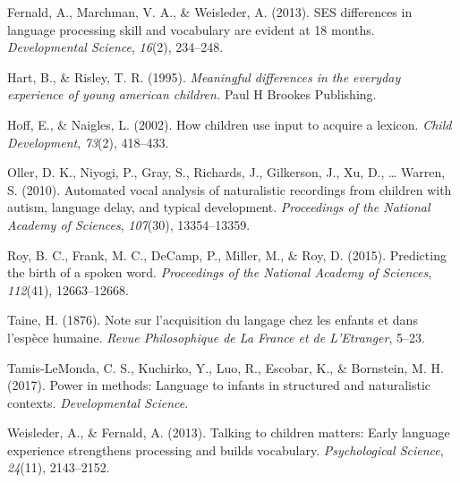 \documentclass[man]{apa6}
\theoremstyle{definition}
\theoremstyle{definition}
\theoremstyle{definition}
\theoremstyle{remark}
\begin{document}
\hypertarget{ref-fernald2013ses}{}
Fernald, A., Marchman, V. A., \& Weisleder, A. (2013). SES differences
in language processing skill and vocabulary are evident at 18 months.
\emph{Developmental Science}, \emph{16}(2), 234--248.

\hypertarget{ref-hart1995meaningful}{}
Hart, B., \& Risley, T. R. (1995). \emph{Meaningful differences in the
everyday experience of young american children.} Paul H Brookes
Publishing.

\hypertarget{ref-hoff2002children}{}
Hoff, E., \& Naigles, L. (2002). How children use input to acquire a
lexicon. \emph{Child Development}, \emph{73}(2), 418--433.

\hypertarget{ref-oller2010automated}{}
Oller, D. K., Niyogi, P., Gray, S., Richards, J., Gilkerson, J., Xu, D.,
\ldots{} Warren, S. (2010). Automated vocal analysis of naturalistic
recordings from children with autism, language delay, and typical
development. \emph{Proceedings of the National Academy of Sciences},
\emph{107}(30), 13354--13359.

\hypertarget{ref-roy2015predicting}{}
Roy, B. C., Frank, M. C., DeCamp, P., Miller, M., \& Roy, D. (2015).
Predicting the birth of a spoken word. \emph{Proceedings of the National
Academy of Sciences}, \emph{112}(41), 12663--12668.

\hypertarget{ref-taine1876note}{}
Taine, H. (1876). Note sur l'acquisition du langage chez les enfants et
dans l'espèce humaine. \emph{Revue Philosophique de La France et de
L'Etranger}, 5--23.

\hypertarget{ref-tamis2017power}{}
Tamis-LeMonda, C. S., Kuchirko, Y., Luo, R., Escobar, K., \& Bornstein,
M. H. (2017). Power in methods: Language to infants in structured and
naturalistic contexts. \emph{Developmental Science}.

\hypertarget{ref-weisleder2013talking}{}
Weisleder, A., \& Fernald, A. (2013). Talking to children matters: Early
language experience strengthens processing and builds vocabulary.
\emph{Psychological Science}, \emph{24}(11), 2143--2152.
\end{document}
